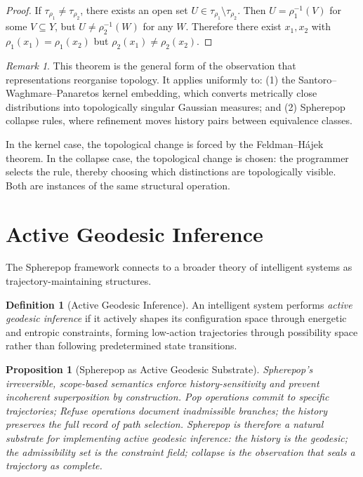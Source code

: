 \documentclass[12pt, a4paper, openany]{book}
\theoremstyle{plain}
\newtheorem{proposition}[theorem]{Proposition}
\theoremstyle{definition}
\newtheorem{definition}[theorem]{Definition}
\theoremstyle{remark}
\newtheorem{remark}[theorem]{Remark}
\begin{document}
\begin{proof}
If $\tau_{\rho_1} \neq \tau_{\rho_2}$, there exists an open set
$U \in \tau_{\rho_1} \setminus \tau_{\rho_2}$. Then $U = \rho_1^{-1}(V)$ for
some $V \subseteq Y$, but $U \neq \rho_2^{-1}(W)$ for any $W$. Therefore there
exist $x_1, x_2$ with $\rho_1(x_1) = \rho_1(x_2)$ but $\rho_2(x_1) \neq \rho_2(x_2)$.
\end{proof}

\begin{remark}
This theorem is the general form of the observation that representations
reorganise topology. It applies uniformly to:
(1) the Santoro--Waghmare--Panaretos kernel embedding, which converts metrically
close distributions into topologically singular Gaussian measures; and
(2) Spherepop collapse rules, where refinement moves history pairs between
equivalence classes.

In the kernel case, the topological change is forced by the Feldman--H\'ajek
theorem. In the collapse case, the topological change is chosen: the programmer
selects the rule, thereby choosing which distinctions are topologically visible.
Both are instances of the same structural operation.
\end{remark}

\section{Active Geodesic Inference}

The Spherepop framework connects to a broader theory of intelligent systems as
trajectory-maintaining structures.

\begin{definition}[Active Geodesic Inference]
An intelligent system performs \emph{active geodesic inference} if it actively
shapes its configuration space through energetic and entropic constraints, forming
low-action trajectories through possibility space rather than following
predetermined state transitions.
\end{definition}

\begin{proposition}[Spherepop as Active Geodesic Substrate]
Spherepop's irreversible, scope-based semantics enforce history-sensitivity and
prevent incoherent superposition by construction. Pop operations commit to
specific trajectories; Refuse operations document inadmissible branches; the
history preserves the full record of path selection. Spherepop is therefore a
natural substrate for implementing active geodesic inference: the history is the
geodesic; the admissibility set is the constraint field; collapse is the
observation that seals a trajectory as complete.
\end{proposition}
\end{document}
